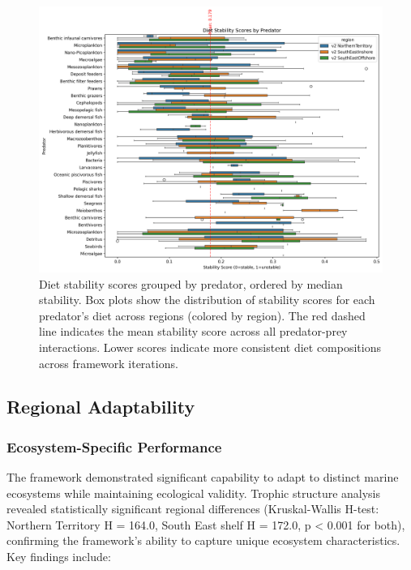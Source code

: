 \begin{figure}[htbp]
    \centering
    \includegraphics[width=\textwidth]{figures/predator_stability_boxplots.png}
    \caption{Diet stability scores grouped by predator, ordered by median stability. Box plots show the distribution of stability scores for each predator's diet across regions (colored by region). The red dashed line indicates the mean stability score across all predator-prey interactions. Lower scores indicate more consistent diet compositions across framework iterations.}
    \label{fig:predator_stability}
\end{figure}

\subsection{Regional Adaptability}

\subsubsection{Ecosystem-Specific Performance}
The framework demonstrated significant capability to adapt to distinct marine ecosystems while maintaining ecological validity. Trophic structure analysis revealed statistically significant regional differences (Kruskal-Wallis H-test: Northern Territory H = 164.0, South East shelf H = 172.0, p < 0.001 for both), confirming the framework's ability to capture unique ecosystem characteristics. Key findings include:

